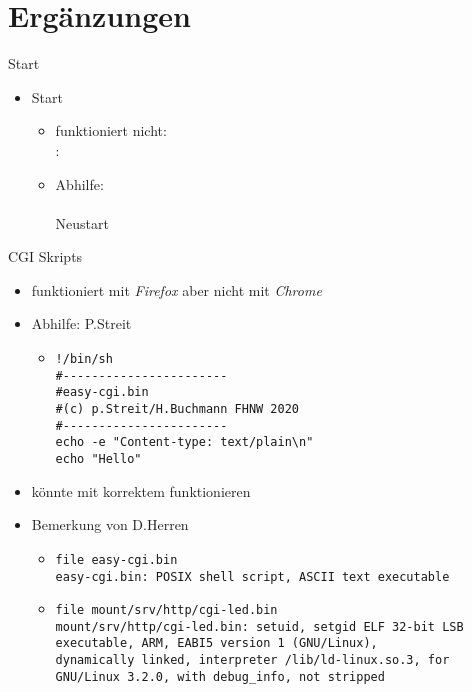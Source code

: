 \documentclass{beamer}
\begin{document}
\section{Ergänzungen}
\begin{frame}{Start}
 \begin{itemize}
  \item Start 
  \begin{itemize}
    \item funktioniert nicht:\\
    :\\
    \item Abhilfe:\\
      \\
      Neustart
  \end{itemize}
 \end{itemize}
\end{frame}

\begin{frame}[fragile]{CGI Skripts}
 \begin{itemize}
  \item funktioniert mit {\em Firefox} aber nicht mit {\em Chrome}
  \item Abhilfe: P.Streit
  \begin{itemize}
   \item
{\tiny
\begin{verbatim}
!/bin/sh
#-----------------------
#easy-cgi.bin
#(c) p.Streit/H.Buchmann FHNW 2020
#-----------------------
echo -e "Content-type: text/plain\n"
echo "Hello"
\end{verbatim}
}
  \end{itemize}
 \item könnte mit korrektem  funktionieren
 \item Bemerkung von D.Herren
 \begin{itemize}
  \item
  {
  \tiny
\begin{verbatim}
file easy-cgi.bin 
easy-cgi.bin: POSIX shell script, ASCII text executable   
\end{verbatim}
  }
 \item
 {\tiny
\begin{verbatim}
file mount/srv/http/cgi-led.bin 
mount/srv/http/cgi-led.bin: setuid, setgid ELF 32-bit LSB executable, ARM, EABI5 version 1 (GNU/Linux), 
dynamically linked, interpreter /lib/ld-linux.so.3, for GNU/Linux 3.2.0, with debug_info, not stripped
\end{verbatim}
}
 \end{itemize}
 \end{itemize}
\end{frame}
\end{document}
